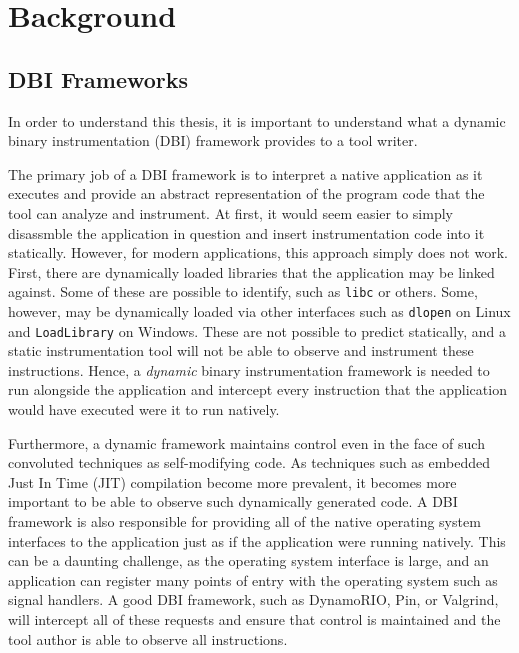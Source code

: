 \chapter{Background}
\label{sec:background}


\section{DBI Frameworks}

In order to understand this thesis, it is important to understand what a dynamic
binary instrumentation (DBI) framework provides to a tool writer.

The primary job of a DBI framework is to interpret a native application as it
executes and provide an abstract representation of the program code that the
tool can analyze and instrument.  At first, it would seem easier to simply
disassmble the application in question and insert instrumentation code into it
statically.  However, for modern applications, this approach simply does not
work.  First, there are dynamically loaded libraries that the application may be
linked against.  Some of these are possible to identify, such as {\tt libc} or
others.  Some, however, may be dynamically loaded via other interfaces such as
{\tt dlopen} on Linux and {\tt LoadLibrary} on Windows.  These are not possible
to predict statically, and a static instrumentation tool will not be able to
observe and instrument these instructions.  Hence, a {\em dynamic} binary
instrumentation framework is needed to run alongside the application and
intercept every instruction that the application would have executed were it to
run natively.

Furthermore, a dynamic framework maintains control even in the face of such
convoluted techniques as self-modifying code.  As techniques such as embedded
Just In Time (JIT) compilation become more prevalent, it becomes more important
to be able to observe such dynamically generated code.  A DBI framework is also
responsible for providing all of the native operating system interfaces to the
application just as if the application were running natively.  This can be a
daunting challenge, as the operating system interface is large, and an
application can register many points of entry with the operating system such as
signal handlers.  A good DBI framework, such as DynamoRIO, Pin, or Valgrind,
will intercept all of these requests and ensure that control is maintained and
the tool author is able to observe all instructions.

